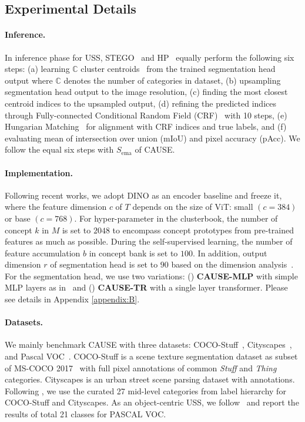 \documentclass{article} \usepackage{iclr2024_conference,times}
\begin{document}
\subsection{Experimental Details}
\vspace{-1.5mm}
\paragraph{Inference.} In inference phase for USS, STEGO~\citep{hamilton2022unsupervised} and HP~\citep{seong2023leveraging} equally perform the following six steps: (a) learning $\mathbb{C}$ cluster centroids~\citep{caron2018deep} from the trained segmentation head output where $\mathbb{C}$ denotes the number of categories in dataset, (b) upsampling segmentation head output to the image resolution, (c) finding the most closest centroid indices to the upsampled output, (d) refining the predicted indices through Fully-connected Conditional Random Field (CRF)~\citep{krahenbuhl2011efficient} with 10 steps, (e) Hungarian Matching~\citep{kuhn1955hungarian} for alignment with CRF indices and true labels, and (f) evaluating mean of intersection over union (mIoU) and pixel accuracy (pAcc). We follow the equal six steps with $S_{\text{ema}}$ of CAUSE.

\paragraph{Implementation.} Following recent works, we adopt DINO as an encoder baseline and freeze it, where the feature dimension $c$ of $T$ depends on the size of ViT: small $(c=384)$ or base $(c=768)$. For hyper-parameter in the clusterbook, the number of concept $k$ in $M$ is set to $2048$ to encompass concept prototypes from pre-trained features as much as possible. During the self-supervised learning, the number of feature accumulation $b$ in concept bank is set to $100$. In addition, output dimension $r$ of segmentation head is set to $90$ based on the dimension analysis~\citep{koenig2023uncovering}. For the segmentation head, we use two variations: (\lowercase\expandafter{}) \textbf{CAUSE-MLP} with simple MLP layers as in~\citet{hamilton2022unsupervised} and (\lowercase\expandafter{}) \textbf{CAUSE-TR} with a single layer transformer. Please see details in Appendix \ref{appendix:B}.

\paragraph{Datasets.}
We mainly benchmark CAUSE with three datasets: COCO-Stuff~\citep{caesar2018coco}, Cityscapes~\citep{cordts2016cityscapes}, and Pascal VOC~\citep{everingham2010pascal}. COCO-Stuff is a scene texture segmentation dataset as subset of MS-COCO 2017~\citep{lin2014microsoft} with full pixel annotations of common \textit{Stuff} and \textit{Thing} categories. Cityscapes is an urban street scene parsing dataset with annotations. Following \citet{ji2019invariant, cho2021picie}, we use the curated 27 mid-level categories from label hierarchy for COCO-Stuff and Cityscapes. As an object-centric USS, we follow~\citet{van2022discovering} and report the results of total 21 classes for PASCAL VOC.
\end{document}

